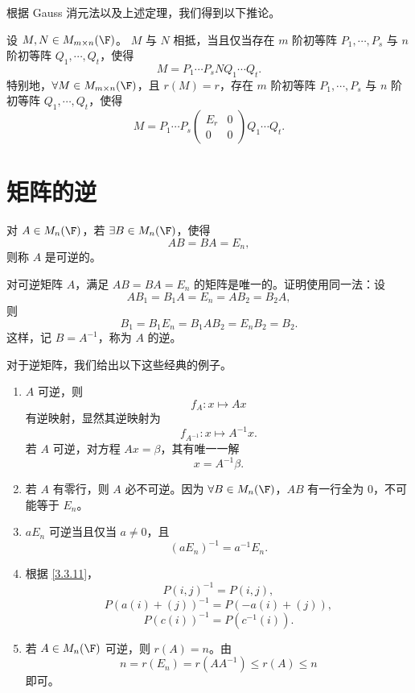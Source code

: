 根据 Gauss 消元法以及上述定理，我们得到以下推论。
\begin{corollary}
	设 $M,N\in M_{m\times n}(\F)$。
	$M$ 与 $N$ 相抵，当且仅当存在 $m$ 阶初等阵 $P_1,\cdots,P_s$ 与 $n$ 阶初等阵 $Q_1,\cdots,Q_t$，使得
	\[
	M=P_1\cdots P_sNQ_1\cdots Q_t.
	\]
	特别地，$\forall M\in M_{m\times n}(\F)$，且 $r(M)=r$，存在 $m$ 阶初等阵 $P_1,\cdots,P_s$ 与 $n$ 阶初等阵 $Q_1,\cdots,Q_t$，使得
	\[
	M=P_1\cdots P_s
	\begin{pmatrix}
		E_r&0\\
		0&0
	\end{pmatrix}
	Q_1\cdots Q_t.
	\]
\end{corollary}

\section{矩阵的逆}

\begin{definition}\label{3.4.1}
	对 $A\in M_n(\F)$，若 $\exists B\in M_n(\F)$，使得
	\[
	AB=BA=E_n,
	\]
	则称 $A$ 是可逆的。
	
	对可逆矩阵 $A$，满足 $AB=BA=E_n$ 的矩阵是唯一的。证明使用同一法：设
	\[
	AB_1=B_1A=E_n=AB_2=B_2A,
	\]
	则
	\[
	B_1=B_1E_n=B_1AB_2=E_nB_2=B_2.
	\]
	这样，记 $B=A^{-1}$，称为 $A$ 的逆。
\end{definition}

对于逆矩阵，我们给出以下这些经典的例子。
\begin{example}\label{3.4.2}
	\begin{enumerate}
		\item $A$ 可逆，则
		\[
		f_A:x\longmapsto Ax
		\]
		有逆映射，显然其逆映射为
		\[
		f_{A^{-1}}:x\longmapsto A^{-1}x.
		\]
		若 $A$ 可逆，对方程 $Ax=\beta$，其有唯一一解
		\[
		x=A^{-1}\beta.
		\]
		
		\item 若 $A$ 有零行，则 $A$ 必不可逆。因为 $\forall B\in M_n(\F)$，$AB$ 有一行全为 $0$，不可能等于 $E_n$。
		
		\item $aE_n$ 可逆当且仅当 $a\neq0$，且
		\[
		(aE_n)^{-1}=a^{-1}E_n.
		\]
		
		\item 根据 \ref{3.3.11}，
		\[
		P(i,j)^{-1}=P(i,j),
		\]
		\[
		P(a(i)+(j))^{-1}=P(-a(i)+(j)),
		\]
		\[
		P(c(i))^{-1}=P(c^{-1}(i)).
		\]
		
		\item 若 $A\in M_n(\F)$ 可逆，则 $r(A)=n$。由
		\[
		n=r(E_n)=r(AA^{-1})\leq r(A)\leq n
		\]
		即可。
	\end{enumerate}
\end{example}


